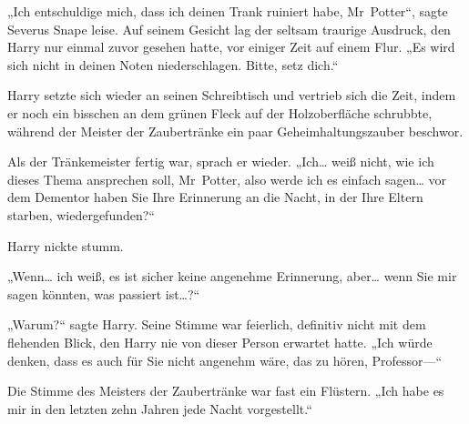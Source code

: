 „Ich entschuldige mich, dass ich deinen Trank ruiniert habe, Mr~Potter“, sagte Severus Snape leise. Auf seinem Gesicht lag der seltsam traurige Ausdruck, den Harry nur einmal zuvor gesehen hatte, vor einiger Zeit auf einem Flur. „Es wird sich nicht in deinen Noten niederschlagen. Bitte, setz dich.“

Harry setzte sich wieder an seinen Schreibtisch und vertrieb sich die Zeit, indem er noch ein bisschen an dem grünen Fleck auf der Holzoberfläche schrubbte, während der Meister der Zaubertränke ein paar Geheimhaltungszauber beschwor.

Als der Tränkemeister fertig war, sprach er wieder.
„Ich… weiß nicht, wie ich dieses Thema ansprechen soll, Mr~Potter, also werde ich es einfach sagen… vor dem Dementor haben Sie Ihre Erinnerung an die Nacht, in der Ihre Eltern starben, wiedergefunden?“

Harry nickte stumm.

„Wenn… ich weiß, es ist sicher keine angenehme Erinnerung, aber… wenn Sie mir sagen könnten, was passiert ist…?“

„Warum?“ sagte Harry.
Seine Stimme war feierlich, definitiv nicht mit dem flehenden Blick, den Harry nie von dieser Person erwartet hatte.
„Ich würde denken, dass es auch für Sie nicht angenehm wäre, das zu hören, Professor—“

Die Stimme des Meisters der Zaubertränke war fast ein Flüstern.
„Ich habe es mir in den letzten zehn Jahren jede Nacht vorgestellt.“

